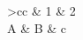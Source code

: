 \begin{table}
\centering
\begin{tabular}{>{}cc}
	\toprule[1pt]
	\rowcolor[gray] & 1 & 2 \\
	\midrule[1pt]
	A & B & c \\
	\bottomrule
\end{tabular}
\end{table}